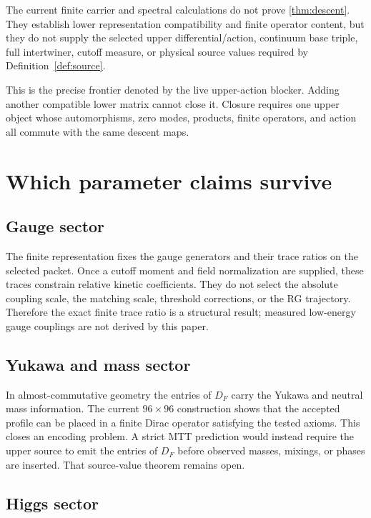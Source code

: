 \documentclass[11pt]{article}
\newcommand{\DF}{D_F}
\begin{document}
\begin{corollary}\label{cor:open}
The current finite carrier and spectral calculations do not prove
\cref{thm:descent}.  They establish lower representation compatibility and
finite operator content, but they do not supply the selected upper
differential/action, continuum base triple, full intertwiner, cutoff measure,
or physical source values required by Definition~\ref{def:source}.
\end{corollary}

This is the precise frontier denoted by the live upper-action blocker.  Adding
another compatible lower matrix cannot close it.  Closure requires one upper
object whose automorphisms, zero modes, products, finite operators, and action
all commute with the same descent maps.

\section{Which parameter claims survive}

\subsection{Gauge sector}

The finite representation fixes the gauge generators and their trace ratios on
the selected packet.  Once a cutoff moment and field normalization are supplied,
these traces constrain relative kinetic coefficients.  They do not select the
absolute coupling scale, the matching scale, threshold corrections, or the RG
trajectory.  Therefore the exact finite trace ratio is a structural result;
measured low-energy gauge couplings are not derived by this paper.

\subsection{Yukawa and mass sector}

In almost-commutative geometry the entries of $\DF$ carry the Yukawa and neutral
mass information.  The current $96\times96$ construction shows that the accepted
profile can be placed in a finite Dirac operator satisfying the tested axioms.
This closes an encoding problem.  A strict MTT prediction would instead require
the upper source to emit the entries of $\DF$ before observed masses, mixings,
or phases are inserted.  That source-value theorem remains open.

\subsection{Higgs sector}
\end{document}
